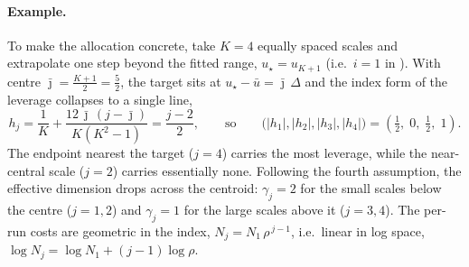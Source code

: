 \paragraph{Example.}
To make the allocation concrete, take $K = 4$ equally spaced scales and extrapolate one step beyond the fitted range, $u_\star = u_{K+1}$ (i.e.\ $i = 1$ in ). With centre $\bar\jmath = \tfrac{K+1}{2} = \tfrac52$, the target sits at $u_\star - \bar u = \bar\jmath\,\Delta$ and the index form of the leverage collapses to a single line,
%
\begin{equation}\label{eq:example-leverage}
    h_j = \frac{1}{K} + \frac{12\,\bar\jmath\,(j - \bar\jmath)}{K(K^2 - 1)}
        = \frac{j - 2}{2},
    \qquad\text{so}\qquad
    \bigl(|h_1|, |h_2|, |h_3|, |h_4|\bigr) = \left(\tfrac12,\; 0,\; \tfrac12,\; 1\right).
\end{equation}
%
The endpoint nearest the target ($j = 4$) carries the most leverage, while the near-central scale ($j = 2$) carries essentially none. Following the fourth assumption, the effective dimension drops across the centroid: $\gamma_j = 2$ for the small scales below the centre ($j = 1, 2$) and $\gamma_j = 1$ for the large scales above it ($j = 3, 4$). The per-run costs are geometric in the index, $N_j = N_1\, \rho^{\,j-1}$, i.e.\ linear in log space, $\log N_j = \log N_1 + (j-1)\log\rho$.

